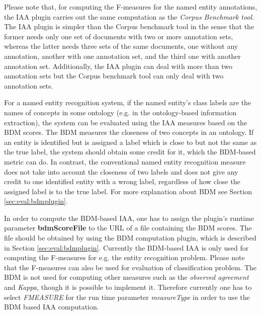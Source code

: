 Please note that, for computing the F-measures for the named entity annotations,
the IAA plugin carries out the same computation as the {\em Corpus Benchmark
tool}.  The IAA plugin is simpler than the Corpus benchmark tool in the sense
that the former needs only one set of documents with two or more annotation sets,
whereas the latter needs three sets of the same documents, one without any
annotation, another with one annotation set, and the third one with another
annotation set. Additionally, the IAA plugin can deal with more than two
annotation sets but the Corpus benchmark tool can only deal with two annotation
sets.


For a named entity recognition system, if the named entity's class
labels are the names of concepts in some ontology (e.g. in the
ontology-based information extraction), the system can be evaluated
using the IAA measures based on the BDM scores. The BDM measures the
closeness of two concepts in an ontology. If an entity is identified
but is assigned a label which is close to but not the same as the true
label, the system should obtain some credit for it, which the
BDM-based metric can do. In contrast, the conventional named entity
recognition measure does not take into account the closeness of two
labels and does not give any credit to one identified entity with a
wrong label, regardless of how close the assigned label is to the true
label. For more explanation about BDM see
Section \ref{sec:eval:bdmplugin}.

In order to compute the BDM-based IAA, one has to assign the plugin's
runtime parameter {\bf bdmScoreFile} to the URL of a file containing
the BDM scores.  The file should be obtained by using the BDM
computation plugin, which is described in
Section \ref{sec:eval:bdmplugin}. Currently the BDM-based IAA is only
used for computing the F-measures for e.g. the entity recognition
problem. Please note that the F-measures can also be used for
evaluation of classification problem.  The BDM is not used for
computing other measures such as the {\em observed agreement} and {\em
Kappa}, though it is possible to implement it.  Therefore currently
one has to select {\em FMEASURE} for the run time parameter {\em
measureType} in order to use the BDM based IAA computation.



